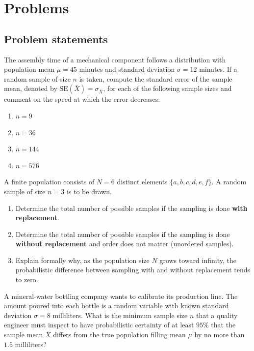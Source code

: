 \section*{Problems}

\subsection*{Problem statements}

\begin{problema}
	\label{prob:c0cebb4}
	The assembly time of a mechanical component follows a distribution with population mean $\mu = 45$ minutes and standard deviation $\sigma = 12$ minutes. If a random sample of size $n$ is taken, compute the standard error of the sample mean, denoted by $\text{SE}(\bar{X}) = \sigma_{\bar{X}}$, for each of the following sample sizes and comment on the speed at which the error decreases:
	\begin{enumerate}
		\item $n = 9$
		\item $n = 36$
		\item $n = 144$
		\item $n = 576$
	\end{enumerate}
\end{problema}

\begin{problema}
	\label{prob:116017b}
	A finite population consists of $N = 6$ distinct elements $\{a, b, c, d, e, f\}$. A random sample of size $n = 3$ is to be drawn.
	\begin{enumerate}
		\item Determine the total number of possible samples if the sampling is done \textbf{with replacement}.
		\item Determine the total number of possible samples if the sampling is done \textbf{without replacement} and order does not matter (unordered samples).
		\item Explain formally why, as the population size $N$ grows toward infinity, the probabilistic difference between sampling with and without replacement tends to zero.
	\end{enumerate}
\end{problema}

\begin{problema}
	\label{prob:2da8cc3}
	A mineral-water bottling company wants to calibrate its production line. The amount poured into each bottle is a random variable with known standard deviation $\sigma = 8$ milliliters. What is the minimum sample size $n$ that a quality engineer must inspect to have probabilistic certainty of at least $95\%$ that the sample mean $\bar{X}$ differs from the true population filling mean $\mu$ by no more than $1.5$ milliliters?
\end{problema}

